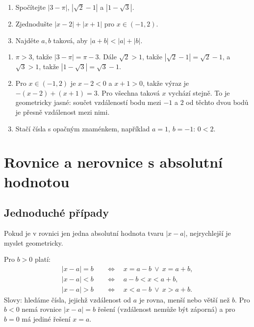 \begin{problem}
  \begin{enumerate}[label=(\alph*)]
    \item Spočítejte $|3 - \pi|$, $|\sqrt{2} - 1|$ a $|1 - \sqrt{3}|$.
    \item Zjednodušte $|x - 2| + |x + 1|$ pro $x\in(-1, 2)$.
    \item Najděte $a, b$ taková, aby $|a + b| < |a| + |b|$.
  \end{enumerate}
\end{problem}

\begin{solution}
  \begin{enumerate}[label=(\alph*)]
    \item $\pi > 3$, takže $|3 - \pi| = \pi - 3$. Dále $\sqrt{2} > 1$, takže $|\sqrt{2} - 1| = \sqrt{2} - 1$, a $\sqrt{3} > 1$, takže $|1 - \sqrt{3}| = \sqrt{3} - 1$.
    \item Pro $x\in(-1, 2)$ je $x - 2 < 0$ a $x + 1 > 0$, takže výraz je $-(x - 2) + (x + 1) = 3$. Pro všechna taková $x$ vychází stejně. To je geometricky jasné: součet vzdáleností bodu mezi $-1$ a $2$ od těchto dvou bodů je přesně vzdálenost mezi nimi.
    \item Stačí čísla s opačným znaménkem, například $a = 1$, $b = -1$: $0 < 2$.
  \end{enumerate}
\end{solution}

\section{Rovnice a nerovnice s absolutní hodnotou}

\subsection{Jednoduché případy}\label{sec:abs-jednoduche}

Pokud je v rovnici jen jedna absolutní hodnota tvaru $|x - a|$, nejrychlejší je myslet geometricky.

\begin{definitionbox}
  Pro $b > 0$ platí:
  \begin{align*}
    |x - a| = b &\quad\Leftrightarrow\quad x = a - b\ \lor\ x = a + b,\\
    |x - a| < b &\quad\Leftrightarrow\quad a - b < x < a + b,\\
    |x - a| > b &\quad\Leftrightarrow\quad x < a - b\ \lor\ x > a + b.
  \end{align*}
  Slovy: hledáme čísla, jejichž vzdálenost od $a$ je rovna, menší nebo větší než $b$. Pro $b < 0$ nemá rovnice $|x - a| = b$ řešení (vzdálenost nemůže být záporná) a pro $b = 0$ má jediné řešení $x = a$.
\end{definitionbox}

